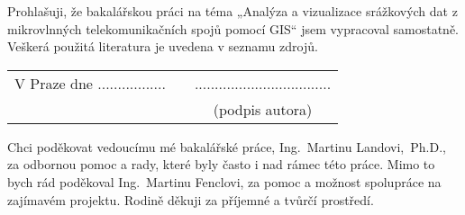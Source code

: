 \newcommand{\odsaditodzhora}{\hskip1pt\vfill}

\odsaditodzhora
{}

 \baselineskip

Prohlašuji, že bakalářskou práci na téma „Analýza a vizualizace
srážkových dat z mikrovlnných telekomunikačních spojů pomocí GIS“ jsem
vypracoval samostatně. Veškerá použitá literatura je uvedena v seznamu
zdrojů.

\begin{flushleft}
\begin{tabular}{cp{}c}
V Praze dne .................
& 
&
..................................
\\
&&
(podpis autora)
\end{tabular}

\end{flushleft}
\newpage

\odsaditodzhora
{}

 \baselineskip

Chci poděkovat vedoucímu mé bakalářské práce, Ing.~Martinu
Landovi,~Ph.D., za odbornou pomoc a rady, které byly často i nad rámec
této práce. Mimo to bych rád poděkoval Ing.~Martinu Fenclovi, za pomoc
a možnost spolupráce na zajímavém projektu. Rodině děkuji za příjemné a tvůrčí
prostředí.

\newpage
